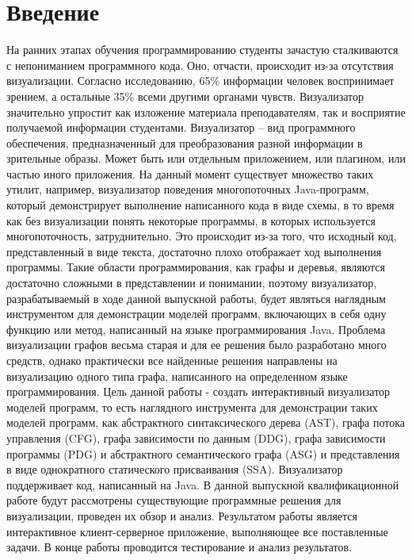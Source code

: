 \chapter*{Введение} %

На ранних этапах обучения программированию студенты зачастую сталкиваются с непониманием программного кода. Оно, отчасти, происходит из-за отсутствия визуализации. Согласно исследованию, 65\% информации человек воспринимает зрением, а остальные 35\% всеми другими органами чувств. Визуализатор значительно упростит как изложение материала преподавателям, так и восприятие получаемой информации студентами. Визуализатор – вид программного обеспечения, предназначенный для преобразования разной информации в зрительные образы. Может быть или отдельным приложением, или плагином, или частью иного приложения. На данный момент существует множество таких утилит, например, визуализатор поведения многопоточных Java-программ, который демонстрирует выполнение написанного кода в виде схемы, в то время как без визуализации понять некоторые программы, в которых используется многопоточность, затруднительно. Это происходит из-за того, что исходный код, представленный в виде текста, достаточно плохо отображает ход выполнения программы. 
Такие области программирования, как графы и деревья, являются достаточно сложными в представлении и понимании, поэтому визуализатор, разрабатываемый в ходе данной выпускной работы, будет являться наглядным инструментом для демонстрации моделей программ, включающих в себя одну функцию или метод, написанный на языке программирования Java. Проблема визуализации графов весьма старая и для ее решения было разработано много средств, однако практически все найденные решения направлены на визуализацию одного типа графа, написанного на определенном языке программирования. Цель данной работы - создать интерактивный визуализатор моделей программ, то есть наглядного инструмента для демонстрации таких моделей программ, как абстрактного синтаксического дерева (AST), графа потока управления (CFG), графа зависимости по данным (DDG), графа зависимости программы (PDG) и абстрактного семантического графа (ASG) и представления в виде однократного статического присваивания (SSA). Визуализатор поддерживает код, написанный на Java. 
В данной выпускной квалификационной работе будут рассмотрены существующие программные решения для визуализации, проведен их обзор и анализ. Результатом работы является интерактивное клиент-серверное приложение, выполняющее все поставленные задачи. В конце работы проводится тестирование и анализ результатов.  



